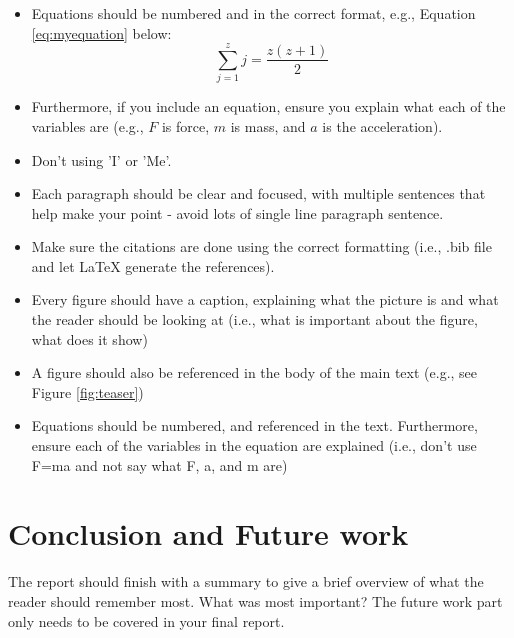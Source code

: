 \documentclass[conference,backref=page]{acmsiggraph}
\begin{document}
\begin{itemize}
\item Equations should be numbered and in the correct format, e.g., Equation \ref{eq:myequation} below:
\begin{equation} \label{eq:myequation}
 \sum_{j=1}^{z} j = \frac{z(z+1)}{2}
\end{equation}
\item Furthermore, if you include an equation, ensure you explain what each of the variables are (e.g., $F$ is force, $m$ is mass, and $a$ is the acceleration).
\item Don't using 'I' or 'Me'.
\item Each paragraph should be clear and focused, with multiple sentences that help make your point - avoid lots of single line paragraph sentence.
\item Make sure the citations are done using the correct formatting (i.e., .bib file and let LaTeX generate the references).
\item Every figure should have a caption, explaining what the picture is and what the reader should be looking at (i.e., what is important about the figure, what does it show)
\item A figure should also be referenced in the body of the main text (e.g., see Figure \ref{fig:teaser})
\item Equations should be numbered, and referenced in the text. Furthermore, ensure each of the variables in the equation are explained (i.e., don't use F=ma and not say what F, a, and m are)
\end{itemize}


\section{Conclusion and Future work}
The report should finish with a summary to give a brief overview of what the reader should remember most.  What was most important? The future work part only needs to be covered in your final report.






\end{document}
